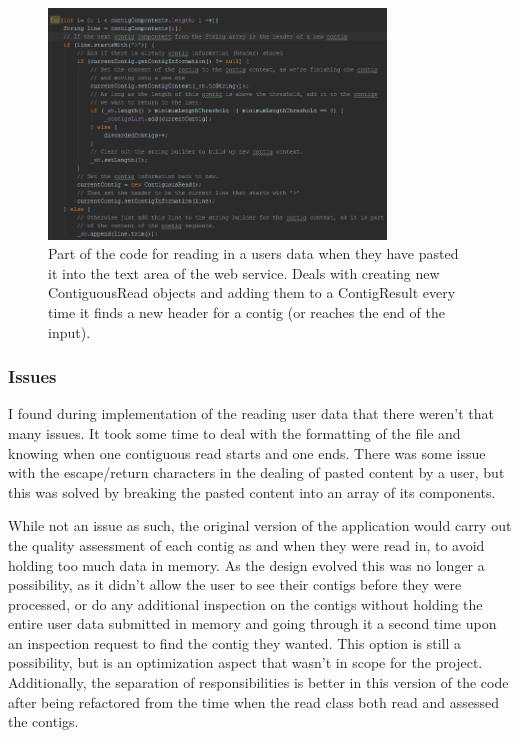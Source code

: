\begin{figure}[H]
\centering
\includegraphics[width=0.8\textwidth]{images/readuserdata}
\caption{Part of the code for reading in a users data when they have pasted it into the text area of the web service. Deals with creating new ContiguousRead objects and adding them to a ContigResult every time it finds a new header for a contig (or reaches the end of the input).}
\end{figure}

\subsubsection{Issues}
I found during implementation of the reading user data that there weren't that many issues. It took some time to deal with the formatting of the file and knowing when one contiguous read starts and one ends. There was some issue with the escape/return characters in the dealing of pasted content by a user, but this was solved by breaking the pasted content into an array of its components.

While not an issue as such, the original version of the application would carry out the quality assessment of each contig as and when they were read in, to avoid holding too much data in memory. As the design evolved this was no longer a possibility, as it didn't allow the user to see their contigs before they were processed, or do any additional inspection on the contigs without holding the entire user data submitted in memory and going through it a second time upon an inspection request to find the contig they wanted. This option is still a possibility, but is an optimization aspect that wasn't in scope for the project. Additionally, the separation of responsibilities is better in this version of the code after being refactored from the time when the read class both read and assessed the contigs.

